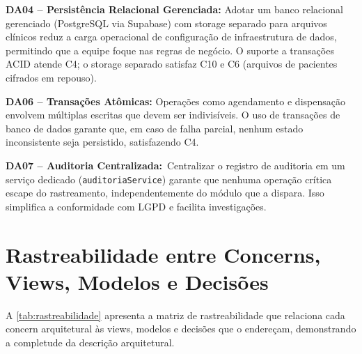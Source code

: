 \textbf{DA04 -- Persistência Relacional Gerenciada:} Adotar um banco relacional gerenciado (PostgreSQL via Supabase) com storage separado para arquivos clínicos reduz a carga operacional de configuração de infraestrutura de dados, permitindo que a equipe foque nas regras de negócio. O suporte a transações ACID atende C4; o storage separado satisfaz C10 e C6 (arquivos de pacientes cifrados em repouso).

\textbf{DA06 -- Transações Atômicas:} Operações como agendamento e dispensação envolvem múltiplas escritas que devem ser indivisíveis. O uso de transações de banco de dados garante que, em caso de falha parcial, nenhum estado inconsistente seja persistido, satisfazendo C4.

\textbf{DA07 -- Auditoria Centralizada:}\ Centralizar o registro de auditoria em um serviço dedicado (\texttt{auditoriaService}) garante que nenhuma operação crítica escape do rastreamento, independentemente do módulo que a dispara. Isso simplifica a conformidade com LGPD e facilita investigações.

\section{Rastreabilidade entre Concerns, Views, Modelos e Decisões}

A \autoref{tab:rastreabilidade} apresenta a matriz de rastreabilidade que relaciona cada concern arquitetural às views, modelos e decisões que o endereçam, demonstrando a completude da descrição arquitetural.

